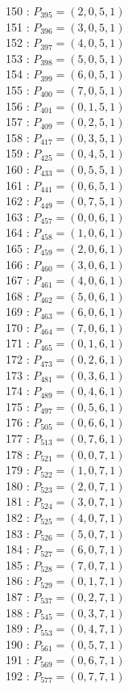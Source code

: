 \documentclass{article}
\begin{document}
{\begin{multicols}{3}
150 : $P_{395}=( 2, 0, 5, 1 )$\\
151 : $P_{396}=( 3, 0, 5, 1 )$\\
152 : $P_{397}=( 4, 0, 5, 1 )$\\
153 : $P_{398}=( 5, 0, 5, 1 )$\\
154 : $P_{399}=( 6, 0, 5, 1 )$\\
155 : $P_{400}=( 7, 0, 5, 1 )$\\
156 : $P_{401}=( 0, 1, 5, 1 )$\\
157 : $P_{409}=( 0, 2, 5, 1 )$\\
158 : $P_{417}=( 0, 3, 5, 1 )$\\
159 : $P_{425}=( 0, 4, 5, 1 )$\\
160 : $P_{433}=( 0, 5, 5, 1 )$\\
161 : $P_{441}=( 0, 6, 5, 1 )$\\
162 : $P_{449}=( 0, 7, 5, 1 )$\\
163 : $P_{457}=( 0, 0, 6, 1 )$\\
164 : $P_{458}=( 1, 0, 6, 1 )$\\
165 : $P_{459}=( 2, 0, 6, 1 )$\\
166 : $P_{460}=( 3, 0, 6, 1 )$\\
167 : $P_{461}=( 4, 0, 6, 1 )$\\
168 : $P_{462}=( 5, 0, 6, 1 )$\\
169 : $P_{463}=( 6, 0, 6, 1 )$\\
170 : $P_{464}=( 7, 0, 6, 1 )$\\
171 : $P_{465}=( 0, 1, 6, 1 )$\\
172 : $P_{473}=( 0, 2, 6, 1 )$\\
173 : $P_{481}=( 0, 3, 6, 1 )$\\
174 : $P_{489}=( 0, 4, 6, 1 )$\\
175 : $P_{497}=( 0, 5, 6, 1 )$\\
176 : $P_{505}=( 0, 6, 6, 1 )$\\
177 : $P_{513}=( 0, 7, 6, 1 )$\\
178 : $P_{521}=( 0, 0, 7, 1 )$\\
179 : $P_{522}=( 1, 0, 7, 1 )$\\
180 : $P_{523}=( 2, 0, 7, 1 )$\\
181 : $P_{524}=( 3, 0, 7, 1 )$\\
182 : $P_{525}=( 4, 0, 7, 1 )$\\
183 : $P_{526}=( 5, 0, 7, 1 )$\\
184 : $P_{527}=( 6, 0, 7, 1 )$\\
185 : $P_{528}=( 7, 0, 7, 1 )$\\
186 : $P_{529}=( 0, 1, 7, 1 )$\\
187 : $P_{537}=( 0, 2, 7, 1 )$\\
188 : $P_{545}=( 0, 3, 7, 1 )$\\
189 : $P_{553}=( 0, 4, 7, 1 )$\\
190 : $P_{561}=( 0, 5, 7, 1 )$\\
191 : $P_{569}=( 0, 6, 7, 1 )$\\
192 : $P_{577}=( 0, 7, 7, 1 )$\\
\end{multicols}


}
\end{document}
